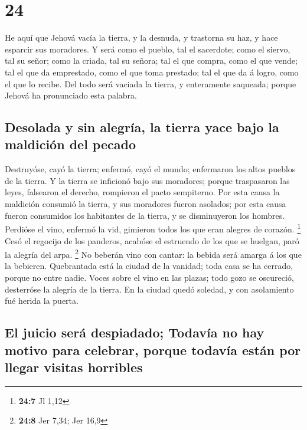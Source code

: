 \hypertarget{section-23}{%
\section{24}\label{section-23}}

 He aquí que Jehová vacía la tierra, y la desnuda, y
trastorna su haz, y hace esparcir sus moradores.  Y será
como el pueblo, tal el sacerdote; como el siervo, tal su señor; como la
criada, tal su señora; tal el que compra, como el que vende; tal el que
da emprestado, como el que toma prestado; tal el que da á logro, como el
que lo recibe.  Del todo será vaciada la tierra, y
enteramente saqueada; porque Jehová ha pronunciado esta palabra.

\hypertarget{desolada-y-sin-alegruxeda-la-tierra-yace-bajo-la-maldiciuxf3n-del-pecado}{%
\subsection{Desolada y sin alegría, la tierra yace bajo la maldición del
pecado}\label{desolada-y-sin-alegruxeda-la-tierra-yace-bajo-la-maldiciuxf3n-del-pecado}}

 Destruyóse, cayó la tierra; enfermó, cayó el mundo;
enfermaron los altos pueblos de la tierra.  Y la tierra se
inficionó bajo sus moradores; porque traspasaron las leyes, falsearon el
derecho, rompieron el pacto sempiterno.  Por esta causa la
maldición consumió la tierra, y sus moradores fueron asolados; por esta
causa fueron consumidos los habitantes de la tierra, y se disminuyeron
los hombres.  Perdióse el vino, enfermó la vid, gimieron
todos los que eran alegres de corazón. \footnote{\textbf{24:7} Jl 1,12}
 Cesó el regocijo de los panderos, acabóse el estruendo de
los que se huelgan, paró la alegría del arpa. \footnote{\textbf{24:8}
  Jer 7,34; Jer 16,9}  No beberán vino con cantar: la
bebida será amarga á los que la bebieren.  Quebrantada
está la ciudad de la vanidad; toda casa se ha cerrado, porque no entre
nadie.  Voces sobre el vino en las plazas; todo gozo se
oscureció, desterróse la alegría de la tierra.  En la
ciudad quedó soledad, y con asolamiento fué herida la puerta.

\hypertarget{el-juicio-seruxe1-despiadado-todavuxeda-no-hay-motivo-para-celebrar-porque-todavuxeda-estuxe1n-por-llegar-visitas-horribles}{%
\subsection{El juicio será despiadado; Todavía no hay motivo para
celebrar, porque todavía están por llegar visitas
horribles}\label{el-juicio-seruxe1-despiadado-todavuxeda-no-hay-motivo-para-celebrar-porque-todavuxeda-estuxe1n-por-llegar-visitas-horribles}}

